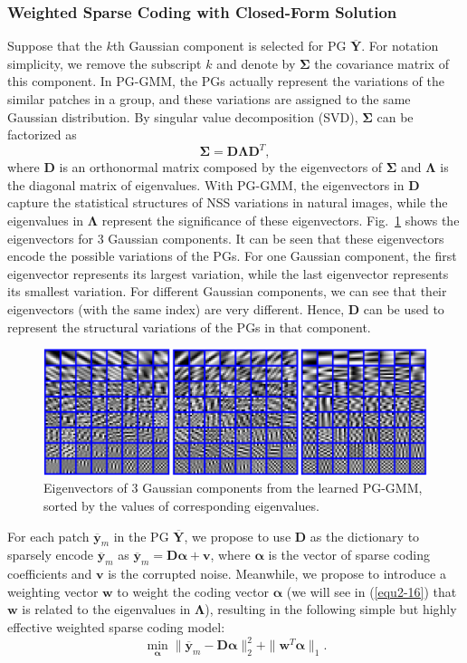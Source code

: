 \subsubsection{Weighted Sparse Coding with Closed-Form Solution}
Suppose that the $k$th Gaussian component is selected for PG $\bm{\overline{Y}}$. For notation simplicity, we remove the subscript $k$ and denote by $\bm{\Sigma}$ the covariance matrix of this component. In PG-GMM, the PGs actually represent the variations of the similar patches in a group, and these variations are assigned to the same Gaussian distribution. By singular value decomposition (SVD), $\bm{\Sigma}$ can be factorized as
\begin{equation}
\label{equ2-10}
\bm{\Sigma} = \bm{D}\bm{\Lambda}\bm{D}^{T},
\end{equation}
where $\bm{D}$ is an orthonormal matrix composed by the eigenvectors of $\bm{\Sigma}$ and $\bm{\Lambda}$ is the diagonal matrix of eigenvalues. With PG-GMM, the eigenvectors  in $\bm{D}$ capture the statistical structures of NSS variations in natural images, while the eigenvalues in $\bm{\Lambda}$ represent the significance of these eigenvectors. Fig.\ \ref{fig2-4} shows the eigenvectors for 3 Gaussian components. It can be seen that these eigenvectors encode the possible variations of the PGs. For one Gaussian component, the first eigenvector represents its largest variation, while the last eigenvector represents its smallest variation. For different Gaussian components, we can see that their eigenvectors (with the same index) are very different. Hence, $\bm{D}$ can be used to represent the structural variations of the PGs in that component.
\begin{figure}[t]
\centering
\includegraphics[width=1\linewidth]{images/pgpd/dics.png}
\caption{Eigenvectors of 3 Gaussian components from the learned PG-GMM, sorted by the values of corresponding eigenvalues.}
\label{fig2-4}
\end{figure}

For each patch $\bm{\overline{y}}_{m}$ in the PG $\bm{\overline{Y}}$, we propose to use $\bm{D}$ as the dictionary to sparsely encode $\bm{\overline{y}}_{m}$ as $\bm{\overline{y}}_{m}=\bm{D}\bm{\alpha}+\bm{v}$, where $\bm{\alpha}$ is the vector of sparse coding coefficients and $\bm{v}$ is the corrupted noise. Meanwhile, we propose to introduce a weighting vector $\bm{w}$ to weight the coding vector $\bm{\alpha}$ (we will see in (\ref{equ2-16}) that $\bm{w}$ is related to the eigenvalues in $\bm{\Lambda}$), resulting in the following simple but highly effective weighted sparse coding model:
\begin{equation}
\label{equ2-11}
\min_{\bm{\alpha}}{\|\bm{\overline{y}}_{m}-\bm{D}\bm{\alpha}\|_{2}^{2}+\|\bm{w}^{T}\bm{\alpha}\|_{1}}.
\end{equation}

